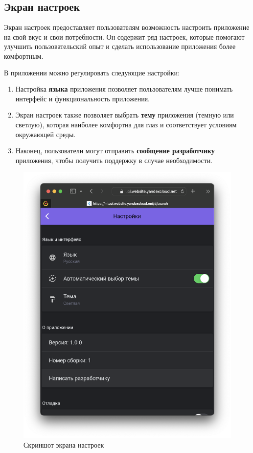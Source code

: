 \subsection{Экран настроек}
Экран настроек предоставляет пользователям возможность настроить
приложение на свой вкус и свои потребности.
Он содержит ряд настроек, которые помогают улучшить
пользовательский опыт и сделать использование приложения более комфортным.

В приложении можно регулировать следующие настройки:
\begin{enumerate}
    \item Настройка \textbf{языка} приложения позволяет пользователям лучше понимать интерфейс и функциональность приложения.
    \item Экран настроек также позволяет выбрать \textbf{тему} приложения (темную или светлую),
    которая наиболее комфортна для глаз и соответствует условиям окружающей среды. 
    \item Наконец, пользователи могут отправить \textbf{сообщение разработчику} приложения,
    чтобы получить поддержку в случае необходимости.
\end{enumerate}

\begin{figure}
\centering
\includegraphics[width=0.8\linewidth]{images/app/settings.png}
\caption{Скриншот экрана настроек}
\label{fig:app:settings}
\end{figure}

